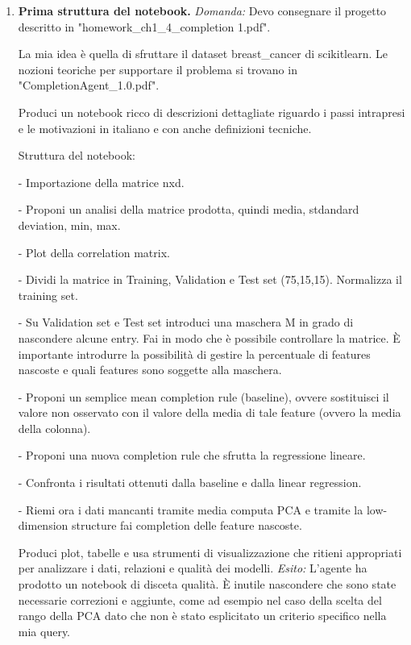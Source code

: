 \documentclass[10pt,a4paper]{article}
\begin{document}
\begin{enumerate}
\item \textbf{Prima struttura del notebook.}
\emph{Domanda:} Devo consegnare il progetto descritto in "homework\_ch1\_4\_completion 1.pdf".

La mia idea è quella di sfruttare il dataset breast\_cancer di scikitlearn. Le nozioni teoriche per supportare il problema si trovano in "CompletionAgent\_1.0.pdf".

Produci un notebook ricco di descrizioni dettagliate riguardo i passi intrapresi e le motivazioni in italiano e con anche definizioni tecniche.

Struttura del notebook:

- Importazione della matrice nxd.

- Proponi un analisi della matrice prodotta, quindi media, stdandard deviation, min, max.

- Plot della correlation matrix.

- Dividi la matrice in Training, Validation e Test set (75,15,15). Normalizza il training set.

- Su Validation set e Test set introduci una maschera M in grado di nascondere alcune entry. Fai in modo che è possibile controllare la matrice. È importante 
introdurre la possibilità di gestire la percentuale di features nascoste e quali features sono soggette alla maschera.

- Proponi un semplice mean completion rule (baseline), ovvere sostituisci il valore non osservato con il valore della media di tale feature (ovvero la media della colonna).

- Proponi una nuova completion rule che sfrutta la regressione lineare.

- Confronta i risultati ottenuti dalla baseline e dalla linear regression.

- Riemi ora i dati mancanti tramite media computa PCA e tramite la low-dimension structure fai completion delle feature nascoste.

Produci plot, tabelle e usa strumenti di visualizzazione che ritieni appropriati per analizzare i dati, relazioni e qualità dei modelli.
\emph{Esito:} L'agente ha prodotto un notebook di disceta qualità. È inutile nascondere che sono state necessarie correzioni
e aggiunte, come ad esempio nel caso della scelta del rango della PCA dato che non è stato esplicitato un criterio specifico nella mia query.


\end{enumerate}
\end{document}
